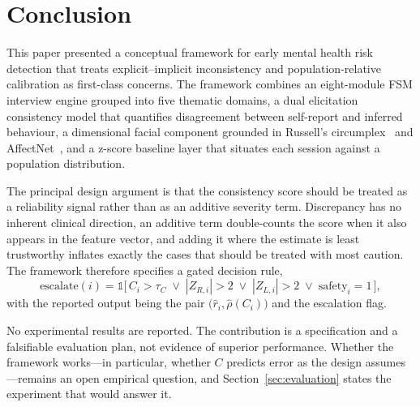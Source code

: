 \documentclass[12pt]{article}
\begin{document}
\section{Conclusion}

This paper presented a conceptual framework for early mental health risk
detection that treats explicit--implicit inconsistency and
population-relative calibration as first-class concerns. The framework
combines an eight-module FSM interview engine grouped into five thematic
domains, a dual elicitation consistency model that quantifies
disagreement between self-report and inferred behaviour, a dimensional
facial component grounded in Russell's
circumplex~\cite{russell1980circumplex} and
AffectNet~\cite{mollahosseini2017affectnet}, and a z-score baseline
layer that situates each session against a population distribution.

The principal design argument is that the consistency score should be
treated as a reliability signal rather than as an additive severity
term. Discrepancy has no inherent clinical direction, an additive term
double-counts the score when it also appears in the feature vector, and
adding it where the estimate is least trustworthy inflates exactly the
cases that should be treated with most caution. The framework therefore
specifies a gated decision rule,
\begin{equation}
\text{escalate}(i) =
\mathbb{1}\bigl[\,C_i > \tau_{C} \;\lor\; |Z_{R,i}| > 2
\;\lor\; |Z_{L,i}| > 2 \;\lor\; \text{safety}_i = 1\,\bigr],
\end{equation}
with the reported output being the pair $\bigl(\hat{r}_i,
\hat{\rho}(C_i)\bigr)$ and the escalation flag.

No experimental results are reported. The contribution is a
specification and a falsifiable evaluation plan, not evidence of
superior performance. Whether the framework works---in particular,
whether $C$ predicts error as the design assumes---remains an open
empirical question, and Section~\ref{sec:evaluation} states the
experiment that would answer it.



\end{document}
